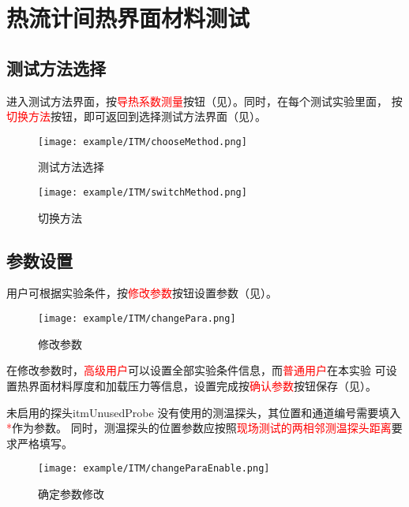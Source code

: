 \section{热流计间热界面材料测试}
\subsection{测试方法选择}
进入测试方法界面，按\textcolor{red}{导热系数测量}按钮（见）。同时，在每个测试实验里面，
按\textcolor{red}{切换方法}按钮，即可返回到选择测试方法界面（见）。
\begin{figure}[H]
	\centering
	\texttt{[image: example/ITM/chooseMethod.png]}
	\caption{ 测试方法选择 \label{fig:exmp_itm_chooseMethod}}
\end{figure}

\begin{figure}[H]
	\centering
	\texttt{[image: example/ITM/switchMethod.png]}
	\caption{ 切换方法 \label{fig:exmp_itm_switchMethod}}
\end{figure}

\subsection{参数设置}
用户可根据实验条件，按\textcolor{red}{修改参数}按钮设置参数（见）。
\begin{figure}[H]
	\centering
	\texttt{[image: example/ITM/changePara.png]}
	\caption{ 修改参数 \label{fig:exmp_itm_changePara}}
\end{figure}
在修改参数时，\textcolor{red}{高级用户}可以设置全部实验条件信息，而\textcolor{red}{普通用户}在本实验
可设置热界面材料厚度和加载压力等信息，设置完成按\textcolor{red}{确认参数}按钮保存（见）。
\begin{tips}{未启用的探头}{itmUnusedProbe}
没有使用的测温探头，其位置和通道编号需要填入\textcolor{red}{*}作为参数。
同时，测温探头的位置参数应按照\textcolor{red}{现场测试的两相邻测温探头距离}要求严格填写。
\end{tips}
\begin{figure}[H]
	\centering
	\texttt{[image: example/ITM/changeParaEnable.png]}
	\caption{ 确定参数修改 \label{fig:exmp_itm_changeParaEnable}}
\end{figure}

